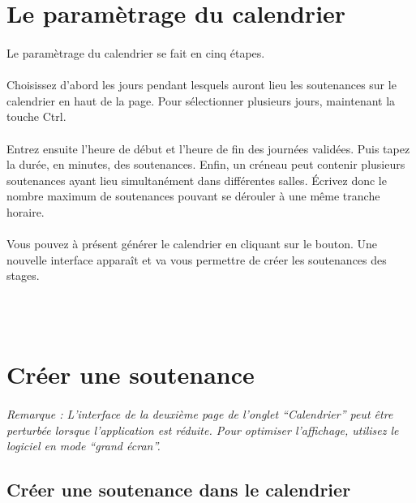 \documentclass[a4paper,10pt]{report}
\begin{document}
    \section{Le paramètrage du calendrier}
      \paragraph{}
	Le paramètrage du calendrier se fait en cinq étapes.
	
      \paragraph{}
	Choisissez d'abord les jours pendant lesquels auront lieu les soutenances sur le calendrier en haut de la page.
	Pour sélectionner plusieurs jours, maintenant la touche Ctrl.
      
      \paragraph{}
	Entrez ensuite l'heure de début et l'heure de fin des journées validées.
	Puis tapez la durée, en minutes, des soutenances.
	Enfin, un créneau peut contenir plusieurs soutenances ayant lieu simultanément dans différentes salles.
	Écrivez donc le nombre maximum de soutenances pouvant se dérouler à une même tranche horaire.
      
      \paragraph{}
	Vous pouvez à présent générer le calendrier en cliquant sur le bouton.
	Une nouvelle interface apparaît et va vous permettre de créer les soutenances des stages.
      
      ~\\~\\
    \section{Créer une soutenance}
    
	\paragraph{}
	  \textit{Remarque : L'interface de la deuxième page de l'onglet ``Calendrier'' peut être perturbée lorsque l'application est réduite. Pour optimiser l'affichage, utilisez le logiciel en mode ``grand écran''.}
    
      \subsection{Créer une soutenance dans le calendrier}
\end{document}
